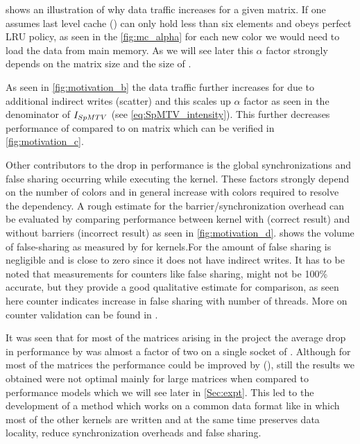     shows an illustration of why data traffic increases for a given matrix. If one assumes last level cache (\LLC) can only hold less than six elements and obeys perfect LRU policy, as seen in the \cref{fig:mc_alpha} for  each new color we would need to load the data from main memory. As we will see later this $\alpha$ factor strongly depends on the matrix size and the size of \LLC.
  
 As seen in \cref{fig:motivation_b} the data traffic further increases for \SpMTV due to additional indirect writes (scatter) and this scales up $\alpha$ factor as seen in the denominator of $I_{SpMTV}$ (see \cref{eq:SpMTV_intensity}).  This further decreases performance of \SpMTV compared to \SpMV on \MC matrix which can be verified in \cref{fig:motivation_c}. 
 
 
Other contributors to the drop in performance is the global synchronizations and false sharing occurring while executing the kernel. These factors strongly depend on the number of colors and in general increase with colors required to resolve the dependency.  A rough estimate for the barrier/synchronization overhead can be evaluated by comparing performance between kernel with (correct result) and without barriers (incorrect result) as seen in \cref{fig:motivation_d}.   shows the volume of false-sharing as measured by \LIKWID for \SpMTV kernels.For \SpMV the amount of false sharing is negligible and is close to zero since it does not have indirect writes. It has to be noted that \LIKWID measurements for counters like false sharing, might not be 100\% accurate, but they provide a good qualitative estimate for comparison, as seen here counter indicates increase in false sharing with number of threads. More on counter validation can be found in \cite{LIKWID_validation}.

It was seen that for most of the matrices arising in the project the average drop in performance by \MCfull was almost a factor of two on a single socket of \IVB. Although for most of the matrices the performance could be improved by \ABMCfull (\ABMC), still the results we obtained were not optimal mainly for large matrices when compared to performance models which we will see later in \cref{Sec:expt}. This led to the development of a method which works on a common data format like \CRS in which most of the other kernels are written and at the same time preserves data locality, reduce synchronization overheads and false sharing.


 


